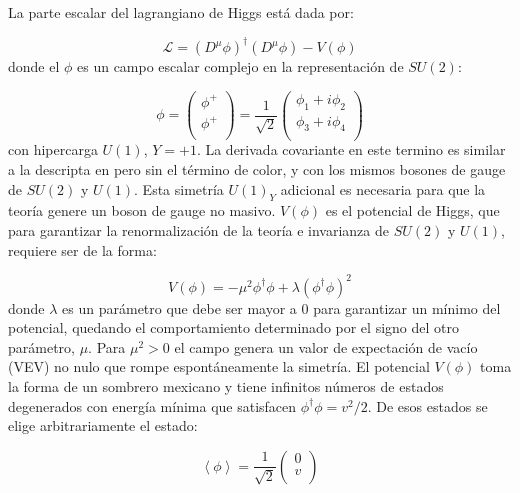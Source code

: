 La parte escalar del lagrangiano de Higgs está dada por:

\begin{equation}
\mathcal{L} = (D^{\mu}\phi)^{\dagger}(D^{\mu}\phi) - V(\phi)
\end{equation}
%
donde el $\phi$ es un campo escalar complejo en la representación de $SU(2)$:

\begin{equation}
	\phi = 
	\begin{pmatrix}
	\phi^{+} \\
	\phi^{+} \\
	\end{pmatrix} = \frac{1}{\sqrt{2}}
	\begin{pmatrix}
	\phi_{1} + i\phi_{2} \\
	\phi_{3} + i\phi_{4} \\
	\end{pmatrix}
\end{equation}
%
con hipercarga $U(1)$, $Y=+1$. La derivada covariante en este termino es similar a la descripta en pero sin el término de color, y con los mismos bosones de gauge de $SU(2)$ y $U(1)$. Esta simetría $U(1)_Y$ adicional es necesaria para que la teoría genere un boson de gauge no masivo.
$V(\phi)$ es el potencial de Higgs, que para garantizar la renormalización de la teoría e invarianza de $SU(2)$ y $U(1)$, requiere ser de la forma:

\begin{equation}
	V(\phi) = - \mu^{2}\phi^{\dagger}\phi + \lambda(\phi^{\dagger}\phi)^{2}
\end{equation}
%
donde $\lambda$ es un parámetro que debe ser mayor a $0$ para garantizar un mínimo del potencial, quedando el comportamiento determinado por el signo del otro parámetro, $\mu$. Para $\mu^2>0$ el campo genera un valor de expectación de vacío (VEV) no nulo que rompe espontáneamente la simetría. El potencial $V(\phi)$ toma la forma de un sombrero mexicano  y tiene infinitos números de estados degenerados con energía mínima que satisfacen $\phi^{\dagger}\phi = v^2/2$. De esos estados se elige arbitrariamente el estado:

\begin{equation}
	\left<\phi\right> = \frac{1}{\sqrt{2}}
	\begin{pmatrix}
	0 \\
	v \\
	\end{pmatrix}
\end{equation}

